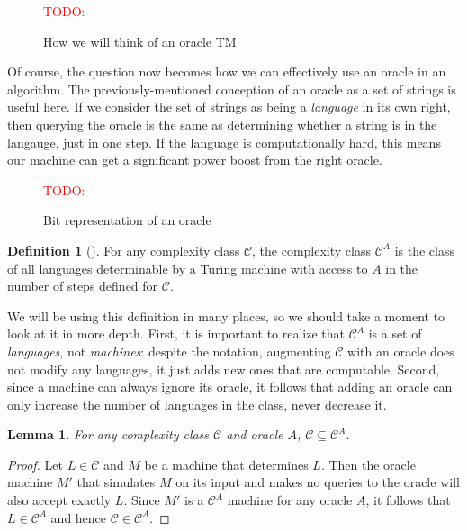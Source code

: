 \documentclass[english,12pt]{reedthesis}
\theoremstyle{plain}
\newtheorem{lemma}[lemma]{Lemma}
\theoremstyle{definition}
\newtheorem{defn}[defn]{Definition}
\theoremstyle{remark}
\newcommand{\TODO}[1]{\textcolor{red}{TODO: #1}}
\begin{document}
\begin{figure}[htbp]
  \TODO{}
  \caption{How we will think of an oracle TM}\label{fig:tm:concept}
\end{figure}

Of course, the question now becomes how we can effectively use an oracle in an
algorithm. The previously-mentioned conception of an oracle as a set of strings
is useful here. If we consider the set of strings as being a \emph{language} in
its own right, then querying the oracle is the same as determining whether a
string is in the langauge, just in one step. If the language is computationally
hard, this means our machine can get a significant power boost from the right
oracle.

\begin{figure}[htbp]
  \TODO{}
  \caption{Bit representation of an oracle}\label{fig:oracle-bits}
\end{figure}

\begin{defn}[{\cite[Def.\ 2.1]{AW09}}]\label{def:oracle-class}
  For any complexity class $\mathcal{C}$, the complexity class $\mathcal{C}^{A}$ is the class of all
  languages determinable by a Turing machine with access to $A$ in the number of
  steps defined for $\mathcal{C}$.
\end{defn}

We will be using this definition in many places, so we should take a moment to
look at it in more depth. First, it is important to realize that $\mathcal{C}^{A}$ is a
set of \emph{languages}, not \emph{machines}: despite the notation, augmenting
$\mathcal{C}$ with an oracle does not modify any languages, it just adds new ones that are
computable. Second, since a machine can always ignore its oracle, it follows
that adding an oracle can only increase the number of languages in the class,
never decrease it.

\begin{lemma}\label{thm:relativizing-increases}
  For any complexity class $\mathcal{C}$ and oracle $A$, $\mathcal{C} \subseteq \mathcal{C}^{A}$.
\end{lemma}

\begin{proof}
  Let $L \in \mathcal{C}$ and $M$ be a machine that determines $L$. Then the oracle machine
  $M'$ that simulates $M$ on its input and makes no queries to the oracle will
  also accept exactly $L$. Since $M'$ is a $\mathcal{C}^{A}$ machine for any oracle $A$,
  it follows that $L \in \mathcal{C}^{A}$ and hence $\mathcal{C} \in \mathcal{C}^{A}$.
\end{proof}
\end{document}
